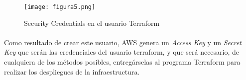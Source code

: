 \documentclass[../../memoria.tex]{subfiles}
\begin{document}
\begin{figure}[H]
    \centering
    \texttt{[image: figura5.png]}
    \caption{Security Credentials en el usuario Terraform}
    \label{fig:figura5}
\end{figure}

\paragraph{}
Como resultado de crear este usuario, AWS genera un \textit{Access Key} y un \textit{Secret Key} que serán las credenciales del usuario terraform, y que será necesario, de cualquiera de los métodos posibles, entregárselas al programa Terraform para realizar los despliegues de la infraestructura.
\end{document}
